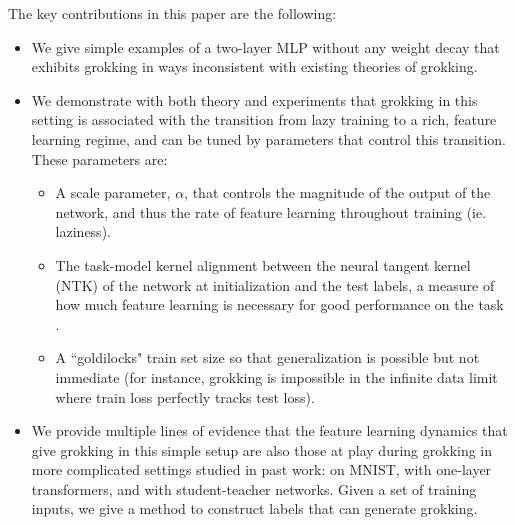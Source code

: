 \documentclass{article} %
\begin{document}
The key contributions in this paper are the following:
%
\begin{itemize}
  \setlength\itemsep{0.5em}
    \item We give simple examples of a two-layer MLP without any weight decay that exhibits grokking in ways inconsistent with existing theories of grokking. 
    \item We demonstrate with both theory and experiments that grokking in this setting is associated with the transition from lazy training to a rich, feature learning regime, and can be tuned by parameters that control this transition. These parameters are:
        \begin{itemize}
        \item A scale parameter, $\alpha$, that controls the magnitude of the output of the network, and thus the rate of feature learning throughout training (ie. laziness).
            \item The task-model kernel alignment between the neural tangent kernel (NTK) of the network at initialization and the test labels, a measure of how much feature learning is necessary for good performance on the task \citep{cortes2012algorithms}. 
            \item A ``goldilocks" train set size so that generalization is possible but not immediate (for instance, grokking is impossible in the infinite data limit where train loss perfectly tracks test loss). 
        \end{itemize}
    \item We provide multiple lines of evidence that the feature learning dynamics that give grokking in this simple setup are also those at play during grokking in more complicated settings studied in past work: on MNIST, with one-layer transformers, and with student-teacher networks. Given a set of training inputs, we give a method to construct labels that can generate grokking. 
\end{itemize}
\end{document}
